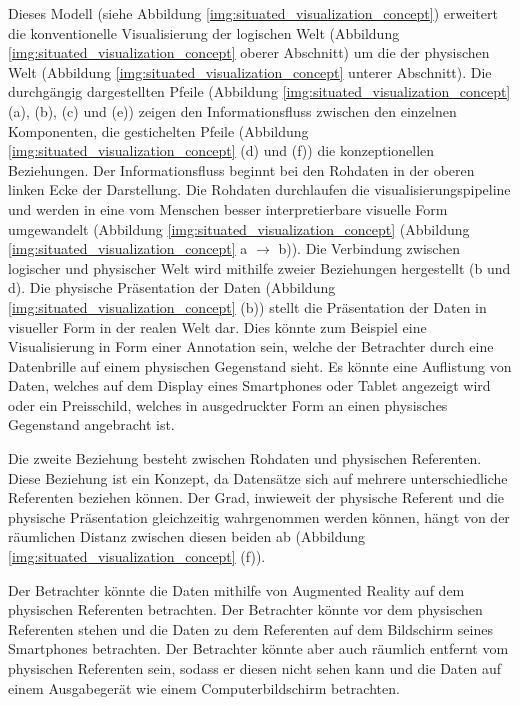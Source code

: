 Dieses Modell (siehe Abbildung \ref{img:situated_visualization_concept}) erweitert die konventionelle Visualisierung der logischen Welt (Abbildung \ref{img:situated_visualization_concept} oberer Abschnitt) um die der physischen Welt (Abbildung \ref{img:situated_visualization_concept} unterer Abschnitt). 
Die durchgängig dargestellten Pfeile (Abbildung \ref{img:situated_visualization_concept} (a), (b), (c) und (e)) zeigen den Informationsfluss zwischen den einzelnen Komponenten, die gestichelten Pfeile (Abbildung \ref{img:situated_visualization_concept} (d) und (f)) die konzeptionellen Beziehungen. Der Informationsfluss beginnt bei den Rohdaten in der oberen linken Ecke der Darstellung. Die Rohdaten durchlaufen die \gls{visualisierungspipeline} und werden in eine vom Menschen besser interpretierbare visuelle Form umgewandelt (Abbildung \ref{img:situated_visualization_concept} (Abbildung \ref{img:situated_visualization_concept} a $\rightarrow$ b)). Die Verbindung zwischen logischer und physischer Welt wird mithilfe zweier Beziehungen hergestellt (b und d). 
Die physische Präsentation der Daten (Abbildung \ref{img:situated_visualization_concept} (b)) stellt die Präsentation der Daten in visueller Form in der realen Welt dar. 
Dies könnte zum Beispiel eine Visualisierung in Form einer Annotation sein, welche der Betrachter durch eine Datenbrille auf einem physischen Gegenstand sieht. Es könnte eine Auflistung von Daten, welches 
auf dem  Display eines Smartphones oder Tablet angezeigt wird oder ein Preisschild, welches in ausgedruckter Form an einen physisches Gegenstand angebracht ist.

Die zweite Beziehung besteht zwischen Rohdaten und physischen Referenten. Diese Beziehung ist ein Konzept, da Datensätze sich auf mehrere unterschiedliche Referenten beziehen können. 
Der Grad, inwieweit der physische Referent und die physische Präsentation gleichzeitig wahrgenommen werden können, hängt von der räumlichen Distanz zwischen diesen beiden ab (Abbildung \ref{img:situated_visualization_concept} (f)). 

Der Betrachter könnte die Daten mithilfe von Augmented Reality auf dem physischen Referenten betrachten. Der Betrachter könnte vor dem physischen Referenten stehen und die Daten zu dem Referenten auf
dem Bildschirm seines Smartphones betrachten. Der Betrachter könnte aber auch räumlich entfernt vom physischen Referenten sein, sodass er diesen nicht sehen kann und die Daten auf einem Ausgabegerät 
wie einem Computerbildschirm betrachten. 

